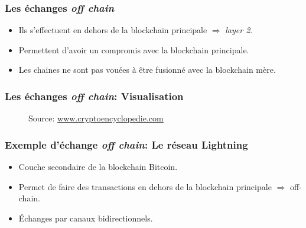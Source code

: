 \begin{frame}
	\frametitle{Les échanges \textit{off chain}}
	\begin{itemize}
		\item Ils s'effectuent en dehors de la blockchain principale $\Rightarrow$ \textit{layer 2}.
		\item Permettent d'avoir un compromis avec la blockchain principale.
		\item Les chaines ne sont pas vouées à être fusionné avec la blockchain mère.
	\end{itemize}
\end{frame}

\begin{frame}
	\frametitle{Les échanges \textit{off chain}: Visualisation}
	\begin{figure}[h!]
		\centering
		{\scriptsize Source: \url{www.cryptoencyclopedie.com}}
		\label{fig:offchain}
	\end{figure}
\end{frame}


\begin{frame}
	\frametitle{Exemple d'échange \textit{off chain}: Le réseau Lightning}
	\begin{itemize}
		\item Couche secondaire de la blockchain Bitcoin. \newline
		\item Permet de faire des transactions en dehors de la blockchain principale $\Rightarrow$ off-chain. \newline
		\item Échanges par canaux bidirectionnels.
	\end{itemize}
\end{frame}


